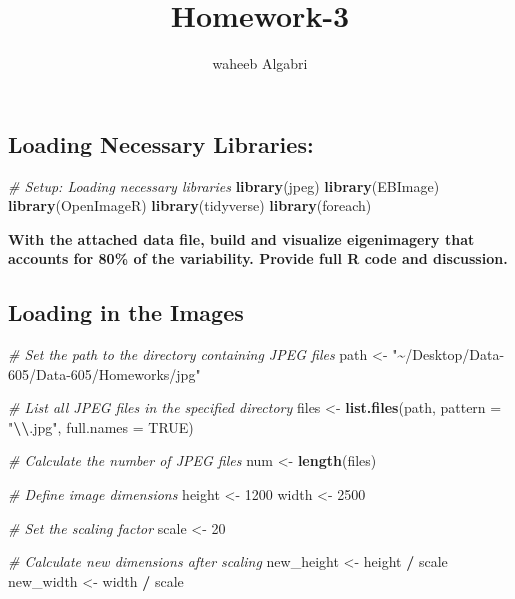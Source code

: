 \documentclass[
]{article}
\title{Homework-3}
\author{waheeb Algabri}
\date{}
\newenvironment{Shaded}{\begin{snugshade}}{\end{snugshade}}
\newcommand{\AttributeTok}[1]{\textcolor[rgb]{0.13,0.29,0.53}{#1}}
\newcommand{\CommentTok}[1]{\textcolor[rgb]{0.56,0.35,0.01}{\textit{#1}}}
\newcommand{\ConstantTok}[1]{\textcolor[rgb]{0.56,0.35,0.01}{#1}}
\newcommand{\DecValTok}[1]{\textcolor[rgb]{0.00,0.00,0.81}{#1}}
\newcommand{\FunctionTok}[1]{\textcolor[rgb]{0.13,0.29,0.53}{\textbf{#1}}}
\newcommand{\NormalTok}[1]{#1}
\newcommand{\OtherTok}[1]{\textcolor[rgb]{0.56,0.35,0.01}{#1}}
\newcommand{\SpecialCharTok}[1]{\textcolor[rgb]{0.81,0.36,0.00}{\textbf{#1}}}
\newcommand{\StringTok}[1]{\textcolor[rgb]{0.31,0.60,0.02}{#1}}
\begin{document}
\maketitle

\hypertarget{loading-necessary-libraries}{%
\subsection{Loading Necessary
Libraries:}\label{loading-necessary-libraries}}

\begin{Shaded}
\begin{Highlighting}[]
\CommentTok{\# Setup: Loading necessary libraries}
\FunctionTok{library}\NormalTok{(jpeg)}
\FunctionTok{library}\NormalTok{(EBImage)}
\FunctionTok{library}\NormalTok{(OpenImageR)}
\FunctionTok{library}\NormalTok{(tidyverse)}
\FunctionTok{library}\NormalTok{(foreach)}
\end{Highlighting}
\end{Shaded}

\textbf{With the attached data file, build and visualize eigenimagery
that accounts for 80\% of the variability. Provide full R code and
discussion.}

\hypertarget{loading-in-the-images}{%
\subsection{Loading in the Images}\label{loading-in-the-images}}

\begin{Shaded}
\begin{Highlighting}[]
\CommentTok{\# Set the path to the directory containing JPEG files}
\NormalTok{path }\OtherTok{\textless{}{-}} \StringTok{"\textasciitilde{}/Desktop/Data{-}605/Data{-}605/Homeworks/jpg"}

\CommentTok{\# List all JPEG files in the specified directory}
\NormalTok{files }\OtherTok{\textless{}{-}} \FunctionTok{list.files}\NormalTok{(path, }\AttributeTok{pattern =} \StringTok{"}\SpecialCharTok{\textbackslash{}\textbackslash{}}\StringTok{.jpg"}\NormalTok{, }\AttributeTok{full.names =} \ConstantTok{TRUE}\NormalTok{)}

\CommentTok{\# Calculate the number of JPEG files}
\NormalTok{num }\OtherTok{\textless{}{-}} \FunctionTok{length}\NormalTok{(files)}

\CommentTok{\# Define image dimensions}
\NormalTok{height }\OtherTok{\textless{}{-}} \DecValTok{1200}
\NormalTok{width }\OtherTok{\textless{}{-}} \DecValTok{2500}

\CommentTok{\# Set the scaling factor}
\NormalTok{scale }\OtherTok{\textless{}{-}} \DecValTok{20}

\CommentTok{\# Calculate new dimensions after scaling}
\NormalTok{new\_height }\OtherTok{\textless{}{-}}\NormalTok{ height }\SpecialCharTok{/}\NormalTok{ scale}
\NormalTok{new\_width }\OtherTok{\textless{}{-}}\NormalTok{ width }\SpecialCharTok{/}\NormalTok{ scale}
\end{Highlighting}
\end{Shaded}
\end{document}
